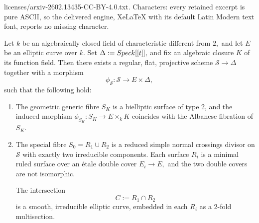 \documentclass[10pt,a4paper]{amsart}
\newcommand{\Spec}{\textnormal{Spec}}
\begin{document}
licenses/arxiv-2602.13435-CC-BY-4.0.txt. Characters: every retained excerpt is pure ASCII, so the delivered engine, XeLaTeX with its default Latin Modern text font, reports no missing character.
\begin{theorem}\label{thm:degeneration_S} Let $k$ be an algebraically closed field of characteristic different from $2,$ and let $E$ be an elliptic curve over $k$. Set $\Delta:=\Spec k[[t]],$ and fix an algebraic closure $K$ of its function field. Then there exists a regular, flat, projective scheme $\mathcal{S}\to\Delta$ together with a morphism $$\phi_{\mathcal{S}}\colon\mathcal{S}\longrightarrow E\times\Delta,$$ such that the following hold:
\begin{enumerate}
    \item\label{it:generic_fibre'} The geometric generic fibre $S_{K}$ is a bielliptic surface of type 2, and the induced morphism $\phi_{S_{K}}\colon S_{K}\to E\times_{k} K$ coincides with the Albanese fibration of $S_{K}$.
    \item\label{it:special_fibre'} The special fibre $S_{0}=R_{1}\cup R_{2}$ is a reduced simple normal crossings divisor on $\mathcal{S}$ with exactly two irreducible components. Each surface $R_{i}$ is a minimal ruled surface over an \'etale double cover $E_{i}\to E,$ and the two double covers are not isomorphic.\par
    The intersection $$C:=R_{1}\cap R_{2}$$ is a smooth, irreducible elliptic curve, embedded in each $R_{i}$ as a $2$-fold multisection. 
\end{enumerate}  
\end{theorem}
\end{document}
